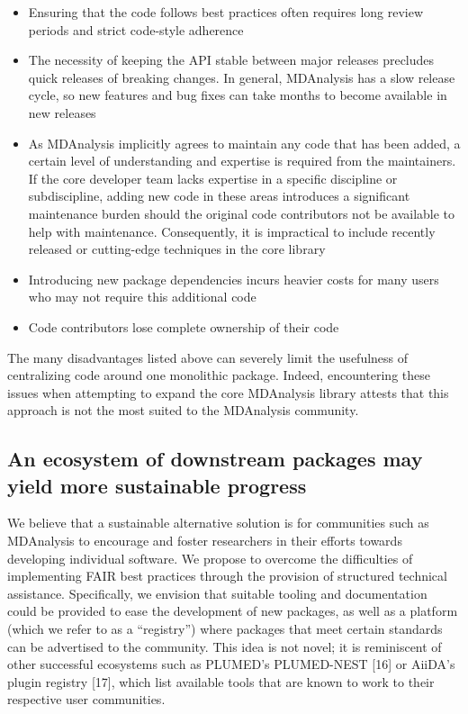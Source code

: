\documentclass{article}
\begin{document}
\begin{itemize}
    \item Ensuring that the code follows best practices often requires long review periods and strict code-style adherence
    \item The necessity of keeping the API stable between major releases precludes quick releases of breaking changes. In general, MDAnalysis has a slow release cycle, so new features and bug fixes can take months to become available in new releases
    \item As MDAnalysis implicitly agrees to maintain any code that has been added, a certain level of understanding and expertise is required from the maintainers. If the core developer team lacks expertise in a specific discipline or subdiscipline, adding new code in these areas introduces a significant maintenance burden should the original code contributors not be available to help with maintenance. Consequently, it is impractical to include recently released or cutting-edge techniques in the core library
    \item Introducing new package dependencies incurs heavier costs for many users who may not require this additional code
    \item Code contributors lose complete ownership of their code
\end{itemize}

The many disadvantages listed above can severely limit the usefulness of centralizing code around one monolithic package. Indeed, encountering these issues when attempting to expand the core MDAnalysis library attests that this approach is not the most suited to the MDAnalysis community.

\subsection{An ecosystem of downstream packages may yield more sustainable progress}

We believe that a sustainable alternative solution is for communities such as MDAnalysis to encourage and foster researchers in their efforts towards developing individual software. We propose to overcome the difficulties of implementing FAIR best practices through the provision of structured technical assistance. Specifically, we envision that suitable tooling and documentation could be provided to ease the development of new packages, as well as a platform (which we refer to as a “registry”) where packages that meet certain standards can be advertised to the community. This idea is not novel; it is reminiscent of other successful ecosystems such as PLUMED’s PLUMED-NEST [16] or AiiDA’s plugin registry [17], which list available tools that are known to work to their respective user communities.
\end{document}

